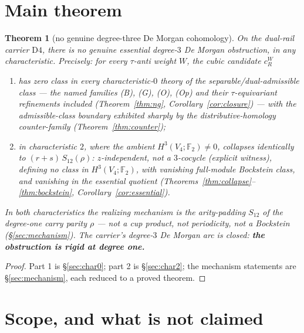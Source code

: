 \documentclass[11pt]{article}
\newtheorem{theorem}{Theorem}[section]
\theoremstyle{definition}
\theoremstyle{remark}
\newcommand{\F}{\mathbb{F}}
\newcommand{\Dfour}{\mathrm{D4}}
\newcommand{\cR}{c_R^W}
\begin{document}
\section{Main theorem}\label{sec:main}

\begin{theorem}[no genuine degree-three De Morgan cohomology]\label{thm:main}
On the dual-rail carrier $\Dfour$, there is no genuine essential degree-$3$ De Morgan obstruction, in any characteristic. Precisely: for every $\tau$-anti weight $W$, the cubic candidate $\cR$
\begin{enumerate}
\item has zero class in every characteristic-$0$ theory of the separable/dual-admissible class --- the named families (B), (G), (O), (Op) and their $\tau$-equivariant refinements included (Theorem~\ref{thm:ng}, Corollary~\ref{cor:closure}) --- with the admissible-class boundary exhibited sharply by the distributive-homology counter-family (Theorem~\ref{thm:counter});
\item in characteristic $2$, where the ambient $H^3(V_4;\F_2)\ne0$, collapses identically to $(r{+}s)\,S_{12}(\rho)$: $z$-independent, not a $3$-cocycle (explicit witness), defining no class in $H^3(V_4;\F_2)$, with vanishing full-module Bockstein class, and vanishing in the essential quotient (Theorems~\ref{thm:collapse}--\ref{thm:bockstein}, Corollary~\ref{cor:essential}).
\end{enumerate}
In both characteristics the realizing mechanism is the arity-padding $S_{12}$ of the degree-one carry parity $\rho$ --- not a cup product, not periodicity, not a Bockstein (\S\ref{sec:mechanism}). The carrier's degree-$3$ De Morgan arc is closed: \textbf{the obstruction is rigid at degree one.}
\end{theorem}

\begin{proof}
Part 1 is \S\ref{sec:char0}; part 2 is \S\ref{sec:char2}; the mechanism statements are \S\ref{sec:mechanism}, each reduced to a proved theorem.
\end{proof}

\section{Scope, and what is not claimed}\label{sec:scope}
\end{document}

